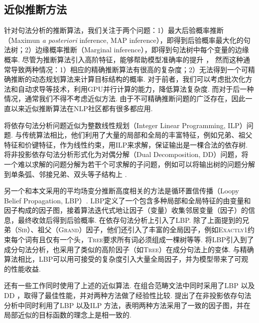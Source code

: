 \subsection{近似推断方法}
针对句法分析的推断算法，我们关注于两个问题：1）最大后验概率推断（Maximun \textit{a posteriori} inference, MAP inference），即得到后验概率最大化的句法树；2）边缘概率推断（Marginal inference），即得到句法树中每个变量的边缘概率.
尽管为推断算法引入高阶特征，能够帮助模型准确率的提升 \citep{mcdonald-pereira-2006-online,carreras-2007-experiments,koo-collins-2010-efficient,ma-zhao-2012-fourth}，
然而这种通常导致两种情况：1）相应的精确推断算法有很高的复杂度；2）无法得到一个可精确推断的动态规划算法来计算目标结构的概率.
对于前者，我们可以考虑批次化方法和自动求导等技术，利用GPU并行计算的能力，降低算法复杂度.
而对于后一种情况，通常我们不得不考虑近似方法.
由于不可精确推断问题的广泛存在，因此一直以来近似推断算法在NLP社区都有很多都应用.

\citet{martins-etal-2009-concise}将依存句法分析问题近似为整数线性规划（Integer Linear Programming, ILP）问题.
与传统算法相比，他们利用了大量的局部和全局的丰富特征，例如兄弟、祖父特征和价键特征，作为线性约束，用ILP来求解，保证输出是一棵合法的依存树.
\citet{koo-etal-2010-dual}将非投影依存句法分析形式化为对偶分解（Dual Decomposition, DD）问题，将一个难以求解的问题分解为若干个可求解的子问题，例如可以将输出树的问题分解到单条弧、邻接兄弟、双头等子结构上 \citep{martins-etal-2011-dual}.

另一个和本文采用的平均场变分推断高度相关的方法是循环置信传播（Loopy Belief Propagation, LBP）.
LBP定义了一个包含多种局部和全局特征的由变量和因子构成的因子图，接着算法迭代式地让因子（变量）收集邻居变量（因子）的信息，最终收敛后得到后验概率.
\citet{smith-eisner-2008-dependency,gormley-etal-2015-approximation}在依存句法分析上引入了LBP.
除了上面提到的兄弟（\textsc{Sib}）、祖父（\textsc{Grand}）因子，他们还引入了丰富的全局因子，例如\textsc{Exactly1}约束每个词有且仅有一个头，\textsc{Tree}要求所有词必须组成一棵树等等.
\citet{naradowsky-etal-2012-grammarless}将LBP引入到了成分句法分析，也采用了类似的高阶因子（如\textsc{Tree}）在成分句法上的变体.
与精确算法相比，LBP可以用可接受的复杂度引入大量全局因子，并为模型带来了可观的性能收益.

还有一些工作同时使用了上述的近似算法.
\citet{auli-lopez-2011-comparison}在组合范畴文法中同时采用了LBP \citep{smith-eisner-2008-dependency}以及DD \citep{koo-etal-2010-dual}，取得了最佳性能，并对两种方法做了经验性比较.
\citet{martins-etal-2010-turbo}提出了在非投影依存句法分析中同时利用了LBP \citep{smith-eisner-2008-dependency}以及ILP \citep{martins-etal-2009-concise}方法，表明两种方法采用了一致的因子图，并在局部近似的目标函数的理念上是相一致的.

